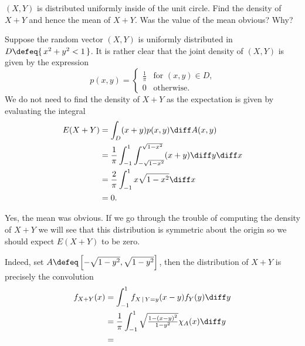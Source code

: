 \begin{problem}[Handout 18, \# 15]
  \((X,Y)\) is distributed uniformly inside of the unit circle. Find the
  density of \(X+Y\) and hence the mean of \(X+Y\). Was the value of the
  mean obvious? Why?
\end{problem}
\begin{solution}
  Suppose the random vector \((X,Y)\) is uniformly distributed in
  \(D\defeq \{\,x^2+y^2<1\,\}\). It is rather clear that the joint density
  of \((X,Y)\) is given by the expression
  \[
    p(x,y)=
    \begin{cases}
      \frac{1}{\pi}&\text{for \((x,y)\in D\),}\\
      0&\text{otherwise.}
    \end{cases}
  \]
  We do not need to find the density of \(X+Y\) as the expectation is given
  by evaluating the integral
  \begin{align*}
    E(X+Y)
    &=\int_D (x+y)p(x,y)\diff A(x,y)\\
    &=\frac{1}{\pi}\int_{-1}^1\int_{-\sqrt{1-x^2}}^{\sqrt{1-x^2}} (x+y)\diff
      y\diff x\\
    &=\frac{2}{\pi}\int_{-1}^1x\sqrt{1-x^2}\diff x\\
    &=0.
  \end{align*}

  Yes, the mean was obvious. If we go through the trouble of computing the
  density of \(X+Y\) we will see that this distribution is symmetric about
  the origin so we should expect \(E(X+Y)\) to be zero.

  Indeed, set \(A\defeq\left[-\sqrt{1-y^2},\sqrt{1-y^2}\right]\), then the
  distribution of \(X+Y\) is precisely the convolution
  \begin{align*}
   f_{X+Y}(x)
    &=\int_{-1}^1 f_{X\,|\,Y=y}(x-y)f_Y(y)\diff y\\
    &=\frac{1}{\pi}\int_{-1}^1\sqrt{\tfrac{1-(x-y)^2}{1-y^2}}\chi_A(x)\diff y\\
    &=
  \end{align*}
\end{solution}
\newpage

